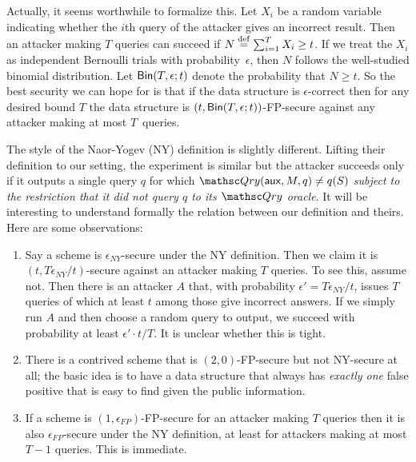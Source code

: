 \def\bin{{\sf Bin}}

Actually, it seems worthwhile to formalize this. Let $X_i$ be a random variable indicating
whether the $i$th query of the attacker gives an incorrect result. Then an attacker making $T$
queries can succeed
if $N \stackrel{{\rm def}}{=} \sum_{i=1}^T X_i \geq t$. If we treat the $X_i$ as independent Bernoulli trials with
probability~$\epsilon$, then $N$ follows the well-studied binomial distribution.
Let $\bin(T, \epsilon; t)$ denote the probability that $N \geq t$. So the best security we can
hope for
is that if the data structure is $\epsilon$-correct then for any desired bound $T$
the data structure is $(t, \bin(T,\epsilon; t))$-FP-secure against any attacker making
at most $T$~queries. 


The style of the Naor-Yogev (NY) definition is slightly different. 
Lifting their definition to our setting, the experiment is similar but the attacker
succeeds only if it outputs a single query $q$ for which $\Qry(\aux, M, q) \neq q(S)$ \emph{subject
to the restriction that it did not query $q$ to its $\Qry$ oracle}.
It will be interesting to understand formally the relation between our definition and theirs.
Here are some observations:
\begin{enumerate}
\item Say a scheme is $\epsilon_{NY}$-secure under the NY definition.
Then we claim it is $(t, T\epsilon_{NY}/t)$-secure against an attacker making $T$ queries. To see
this, assume not. Then there is an attacker $A$ that, with probability $\epsilon'=T\epsilon_{NY}/t$,
issues $T$ queries of which at least $t$ among those give incorrect answers.
If we simply run $A$ and
then choose a random query to output, we succeed with probability at least $\epsilon' \cdot t/T$.
It is unclear whether this is tight.

\item There is a contrived scheme that is $(2, 0)$-FP-secure but not NY-secure at all; the basic idea is
to have a data structure that always has \emph{exactly one} false positive that is easy to find
given the public information.

\item If a scheme is $(1,\epsilon_{FP})$-FP-secure for an attacker making $T$ queries
then it is also $\epsilon_{FP}$-secure under the NY definition,
at least for attackers making at most $T-1$
queries.
This is immediate.
\end{enumerate}

